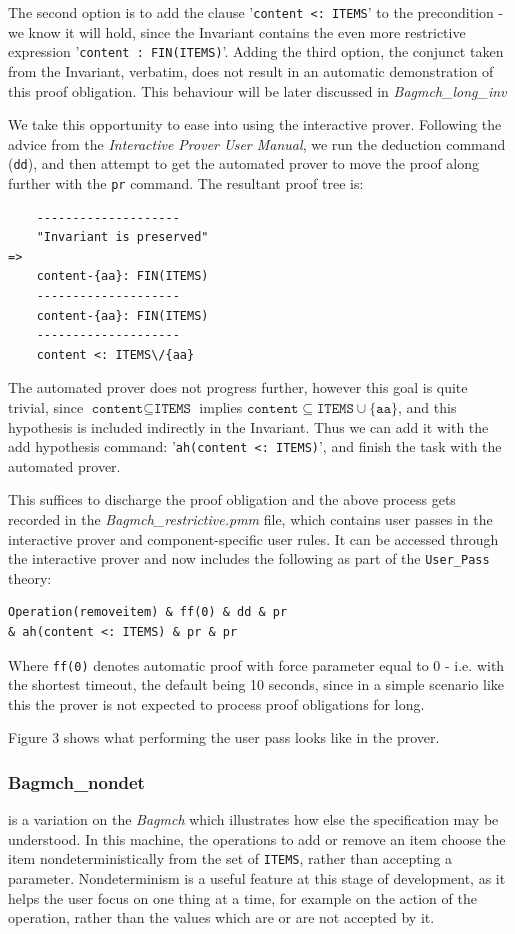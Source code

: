 \documentclass[12pt,journal,duplex]{IEEEtran}
\begin{document}
	The second option is to add the clause '\texttt{content <: ITEMS}' to the precondition - we know it will hold, since the Invariant contains the even more restrictive expression '\texttt{content :  FIN(ITEMS)}'. Adding the third option, the conjunct taken from the Invariant, verbatim, does not result in an automatic demonstration of this proof obligation. This behaviour will be later discussed in \emph{Bagmch\_long\_inv}


	We take this opportunity to ease into using the interactive prover. Following the advice from the \emph{Interactive Prover User Manual}, we run the deduction command (\texttt{dd}), and then attempt to get the automated prover to move the proof along further with the \texttt{pr} command. The resultant proof tree is:

	\begin{lstlisting}
	--------------------
	"Invariant is preserved"
=>
	content-{aa}: FIN(ITEMS)
	--------------------
	content-{aa}: FIN(ITEMS)
	--------------------
	content <: ITEMS\/{aa}
	\end{lstlisting}

	The automated prover does not progress further, however this goal is quite trivial, since $\texttt{content} \subseteq \texttt{ITEMS}$ implies $\texttt{content} \subseteq \texttt{ITEMS} \cup \{\texttt{aa}\}$, and this hypothesis is included indirectly in the Invariant. Thus we can add it with the add hypothesis command: '\texttt{ah(content <: ITEMS)}', and finish the task with the automated prover.

	This suffices to discharge the proof obligation and the above process gets recorded in the \emph{Bagmch\_restrictive.pmm} file, which contains user passes in the interactive prover and component-specific user rules. It can be accessed through the interactive prover and now includes the following as part of the \texttt{User\_Pass} theory:

	\begin{lstlisting}
Operation(removeitem) & ff(0) & dd & pr
& ah(content <: ITEMS) & pr & pr
	\end{lstlisting}
	Where \texttt{ff(0)} denotes automatic proof with force parameter equal to 0 - i.e. with the shortest timeout, the default being 10 seconds, since in a simple scenario like this the prover is not expected to process proof obligations for long.

	Figure 3 shows what performing the user pass looks like in the prover.

	\subsubsection{Bagmch\_nondet} is a variation on the \emph{Bagmch} which illustrates how else the specification may be understood. In this machine, the operations to add or remove an item choose the item nondeterministically from the set of \texttt{ITEMS}, rather than accepting a parameter. Nondeterminism is a useful feature at this stage of development, as it helps the user focus on one thing at a time, for example on the action of the operation, rather than the values which are or are not accepted by it.
\end{document}
